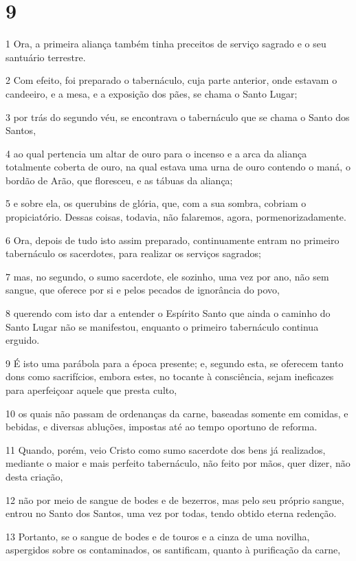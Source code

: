 \chapter{9}

\par 1 Ora, a primeira aliança também tinha preceitos de serviço sagrado e o seu santuário terrestre.
\par 2 Com efeito, foi preparado o tabernáculo, cuja parte anterior, onde estavam o candeeiro, e a mesa, e a exposição dos pães, se chama o Santo Lugar;
\par 3 por trás do segundo véu, se encontrava o tabernáculo que se chama o Santo dos Santos,
\par 4 ao qual pertencia um altar de ouro para o incenso e a arca da aliança totalmente coberta de ouro, na qual estava uma urna de ouro contendo o maná, o bordão de Arão, que floresceu, e as tábuas da aliança;
\par 5 e sobre ela, os querubins de glória, que, com a sua sombra, cobriam o propiciatório. Dessas coisas, todavia, não falaremos, agora, pormenorizadamente.
\par 6 Ora, depois de tudo isto assim preparado, continuamente entram no primeiro tabernáculo os sacerdotes, para realizar os serviços sagrados;
\par 7 mas, no segundo, o sumo sacerdote, ele sozinho, uma vez por ano, não sem sangue, que oferece por si e pelos pecados de ignorância do povo,
\par 8 querendo com isto dar a entender o Espírito Santo que ainda o caminho do Santo Lugar não se manifestou, enquanto o primeiro tabernáculo continua erguido.
\par 9 É isto uma parábola para a época presente; e, segundo esta, se oferecem tanto dons como sacrifícios, embora estes, no tocante à consciência, sejam ineficazes para aperfeiçoar aquele que presta culto,
\par 10 os quais não passam de ordenanças da carne, baseadas somente em comidas, e bebidas, e diversas abluções, impostas até ao tempo oportuno de reforma.
\par 11 Quando, porém, veio Cristo como sumo sacerdote dos bens já realizados, mediante o maior e mais perfeito tabernáculo, não feito por mãos, quer dizer, não desta criação,
\par 12 não por meio de sangue de bodes e de bezerros, mas pelo seu próprio sangue, entrou no Santo dos Santos, uma vez por todas, tendo obtido eterna redenção.
\par 13 Portanto, se o sangue de bodes e de touros e a cinza de uma novilha, aspergidos sobre os contaminados, os santificam, quanto à purificação da carne,
